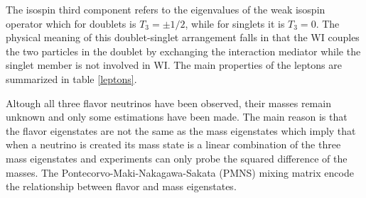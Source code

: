 \noindent The isospin third component refers to the eigenvalues of the weak isospin operator which for doublets is $T_3 = \pm 1/2$, while for singlets it is $T_3=0$. The physical meaning of this doublet-singlet arrangement falls in that the WI couples the two particles in the doublet by exchanging the interaction mediator while the singlet member is not involved in WI. The main properties of the leptons are summarized in table \ref{leptons}.





\noindent Altough all three flavor neutrinos have been observed, their masses remain unknown and only some estimations have been made\cite{nu_mass}. The main reason is that the flavor eigenstates are not the same as the mass eigenstates which imply that when a neutrino is created its mass state is a linear combination of the three mass eigenstates and experiments can only probe the squared difference of the masses. The Pontecorvo-Maki-Nakagawa-Sakata (PMNS) mixing matrix encode the relationship between flavor and mass eigenstates.

